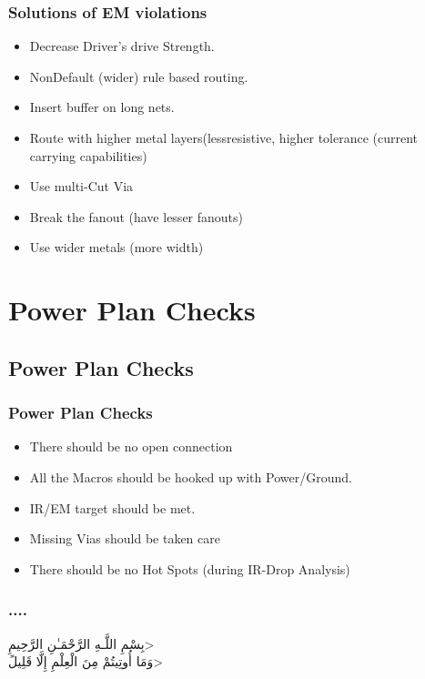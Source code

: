 \documentclass[compress]{beamer}
\begin{document}
\begin{frame}
	\frametitle{Solutions of EM violations}
	\begin{itemize}
		\item Decrease Driver’s drive Strength.
		\item NonDefault (wider) rule based routing.
		\item Insert buffer on long nets.
		\item Route with higher metal layers(lessresistive, higher tolerance (current carrying capabilities)
		\item Use multi-Cut Via
		\item Break the fanout (have lesser fanouts)
		\item Use wider metals (more width)
	\end{itemize}
\end{frame}
\section[Checks]{Power Plan Checks}
\subsection[Checks]{Power Plan Checks}
\begin{frame}
	\frametitle{Power Plan Checks}
	\begin{itemize}
		\item There should be no open connection
		\item All the Macros should be hooked up with Power/Ground.
		\item IR/EM target should be met.
		\item Missing Vias should be taken care
		\item There should be no Hot Spots (during IR-Drop Analysis)
	\end{itemize}
\end{frame}
\begin{frame}
	\frametitle{....}
	\begin{center}
		\<بِسْمِ اللَّـهِ الرَّحْمَـٰنِ الرَّحِيمِ> \\
		\<وَمَا أُوتِيتُمْ مِنَ الْعِلْمِ إِلَّا قَلِيلً>
		
	\end{center}
\end{frame}
\end{document}
